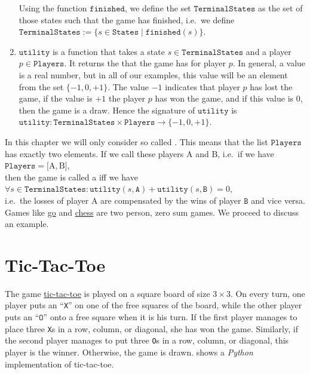 \begin{enumerate}
      Using the function $\texttt{finished}$, we define the set $\texttt{TerminalStates}$ as the set of those
      states such that the game has finished,  i.e.~we define 
      \\[0.2cm]
      \hspace*{1.3cm}
      $\texttt{TerminalStates} := \{ s \in \texttt{States} \mid \texttt{finished}(s) \}$.
\item $\texttt{utility}$ is a function that takes a state $s \in \texttt{TerminalStates}$ and a player $p \in \texttt{Players}$.  It returns
      the  that the game has for player $p$.  In general, a value is a real number,  but in all of
      our examples, this value will be an element from the set $\{-1, 0, +1\}$.  The value $-1$ indicates that
      player $p$ has lost the game, if the value is $+1$ the player $p$ has won the game, and if this value is
      $0$, then the game is a draw.  Hence the signature of $\texttt{utility}$ is
      \\[0.2cm]
      \hspace*{1.3cm}
      $\texttt{utility}: \texttt{TerminalStates} \times \texttt{Players} \rightarrow \{ -1, 0, +1\}$.
\end{enumerate}
In this chapter we will only consider so called .  
This means that the list $\texttt{Players}$ has exactly two elements.  If we call these players $\mathrm{A}$ and $\mathrm{B}$, i.e.~if we have
\\[0.2cm]
\hspace*{1.3cm}
$\texttt{Players} = \bigl[ \mathrm{A}, \mathrm{B} \bigr]$,
\\[0.2cm]
then the game is called a  iff we have
\\[0.2cm]
\hspace*{1.3cm}
$\forall s \in \texttt{TerminalStates}:\texttt{utility}(s, \texttt{A}) + \texttt{utility}(s, \texttt{B}) = 0$,
\\[0.2cm]
i.e.~the losses of player $\mathrm{A}$ are compensated by the wins of player $\texttt{B}$ and vice versa.
Games like \href{https://en.wikipedia.org/wiki/Go_(game)}{go} and 
\href{https://en.wikipedia.org/wiki/Chess}{chess} are two person, zero sum games.
We proceed to discuss an example.

\section{Tic-Tac-Toe}
The game \href{https://en.wikipedia.org/wiki/Tic-tac-toe}{tic-tac-toe} is played on a square board of size 
$3 \times 3$.  On every turn, one player puts an ``\texttt{X}'' on one of the free squares of the board, while
the other player puts an ``$\texttt{O}$'' onto a free square when it is his turn.  If the first player manages
to place three \texttt{X}s in a row, column, or diagonal, she has won the game.  Similarly, if the second
player manages to put three \texttt{O}s in a row, column, or diagonal, this player is the winner.  Otherwise,
the game is drawn.   shows a \textsl{Python} implementation of tic-tac-toe.


